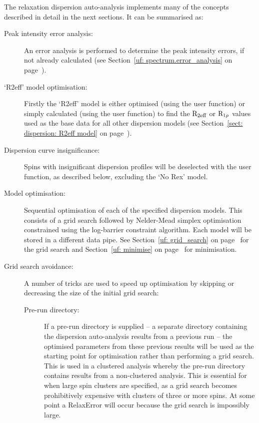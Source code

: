 The relaxation dispersion auto-analysis implements many of the concepts described in detail in the next sections.
It can be summarised as:
\begin{description}
  \item[Peak intensity error analysis:]  An error analysis is performed to determine the peak intensity errors, if not already calculated (see Section~\ref{uf: spectrum.error_analysis} on page~\pageref{uf: spectrum.error_analysis}).
  \item[`R2eff' model optimisation:]  Firstly the `R2eff' model is either optimised (using the  user function) or simply calculated (using the  user function) to find the $\mathrm{R}_\textrm{2eff}$ or $\mathrm{R}_{1\rho}$ values used as the base data for all other dispersion models (see Section~\ref{sect: dispersion: R2eff model} on page~\pageref{sect: dispersion: R2eff model}).
  \item[Dispersion curve insignificance:]  Spins with insignificant dispersion profiles will be deselected with the  user function, as described below, excluding the `No Rex' model.
  \item[Model optimisation:]  Sequential optimisation of each of the specified dispersion models.
    This consists of a grid search followed by Nelder-Mead simplex optimisation constrained using the log-barrier constraint algorithm.
    Each model will be stored in a different data pipe.
    See Section~\ref{uf: grid_search} on page~\pageref{uf: grid_search} for the grid search and Section~\ref{uf: minimise} on page~\pageref{uf: minimise} for minimisation.
  \item[Grid search avoidance:]  A number of tricks are used to speed up optimisation by skipping or decreasing the size of the initial grid search:
  \begin{description}
    \item[Pre-run directory:]  If a pre-run directory is supplied -- a separate directory containing the dispersion auto-analysis results from a previous run -- the optimised parameters from these previous results will be used as the starting point for optimisation rather than performing a grid search.
      This is used in a clustered analysis whereby the pre-run directory contains results from a non-clustered analysis.
      This is essential for when large spin clusters are specified, as a grid search becomes prohibitively expensive with clusters of three or more spins.
      At some point a RelaxError will occur because the grid search is impossibly large.

\end{description}
\end{description}
